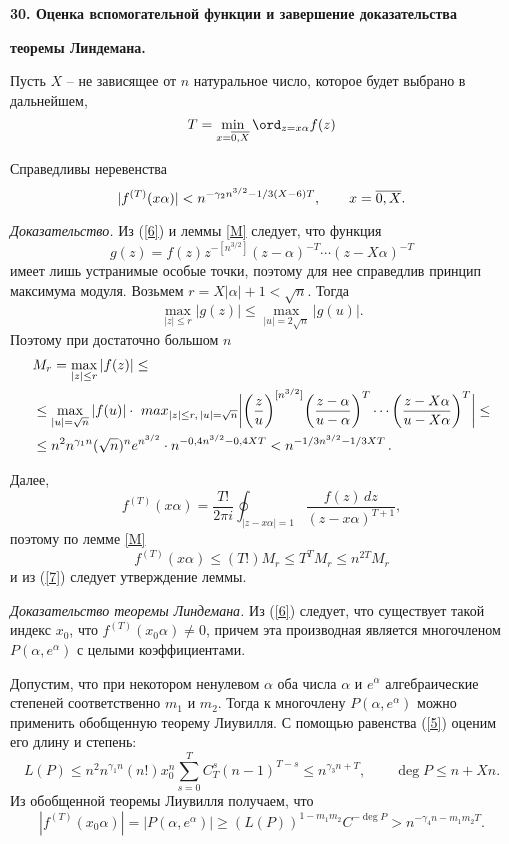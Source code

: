\vskip 5mm \centerline{\bf {30. Оценка
вспомогательной функции и завершение
доказательства}  } \centerline{\bf {теоремы
Линдемана.}}
 \vskip 5mm

Пусть $X$  -- не зависящее от $n$ натуральное число, которое будет
выбрано в дальнейшем,
\begin{equation}\label{6}
T=\min_{x=\ol{0,X}}\ord_{z=x \alpha}f(z)
\end{equation}
\begin{lemma}\label{N}  Справедливы неревенства
$$
|f^{(T)}(x \alpha)| < n^{-\gamma_2n^{3/2}-1/3(X-6)T}, \qquad
x=\overline{0,X}.
$$
\end{lemma}

\emph{Доказательство.}  Из (\ref{6}) и леммы
\ref{M} следует, что функция
$$
g(z)=f(z)z^{-[n^{3/2}]}(z-\alpha)^{-T} \cdots (z-X\alpha)^{-T}
$$
имеет лишь устранимые особые точки, поэтому для нее справедлив
принцип максимума модуля. Возьмем $r=X|\alpha |+1<\sqrt n$. Тогда
$$
\max_{|z| \le r}|g(z)| \le \max_{|u|=2\sqrt n}|g(u)|.
$$
Поэтому   при достаточно большом $n$
\begin{equation}\label{7}
\aligned &
M_r=\max_{|z| \le r}|f(z)| \le  \\
& \le\max_{|u|=\sqrt n}|f(u)| \cdot \ max_{|z|
\le r,\,  |u|=\sqrt n} \biggl|\biggl(\frac zu
\biggr)^{[n^{3/2}]}
\biggl(\frac{z-\alpha}{u-\alpha}\biggr)^T \cdots
\biggl(\frac{z-X\alpha}{u-X\alpha}\biggr)^T
\biggr| \le \\
 & \le n^2n^{\gamma_1n}(\sqrt n)^n
e^{n^{3/2}}\cdot
 n^{-0,4n^{3/2}-0,4XT}<n^{-1/3n^{3/2}-1/3XT}\,.
\endaligned
\end{equation}


Далее,
$$
f^{(T)}(x\alpha)= \frac{T!}{2\pi i}\oint_{|z-x\alpha|=1} \frac
{f(z)\,dz}{(z-x\alpha)^{T+1}},
$$
поэтому по лемме \ref{M}
$$
f^{(T)}(x\alpha) \le (T!)M_r \le T^TM_r \le n^{2T}M_r
$$
и из (\ref{7}) следует утверждение леммы.


\emph{Доказательство теоремы Линдемана.} Из
(\ref{6}) следует, что существует такой индекс
$x_0$, что $f^{(T)}(x_0\alpha) \ne 0$, причем эта
производная является многочленом
$P(\alpha,e^{\alpha})$ с целыми коэффициентами.

Допустим, что при некотором ненулевом $\alpha$
оба числа $\alpha$  и $e^{\alpha}$ алгебраические
степеней соответственно $m_1$ и $m_2$. Тогда к
многочлену $P(\alpha, e^{\alpha}) $ можно
применить обобщенную теорему Лиувилля. С помощью
равенства (\ref{5}) оценим его длину и степень:
$$
L(P) \le n^2n^{\gamma_1n}(n!)x_0^n\sum_{s=0}^TC_T^s(n-1)^{T-s} \le
n^{\gamma_3n+T}, \qquad \deg P \le n+Xn.
$$
Из обобщенной теоремы Лиувилля получаем, что
$$
|f^{(T)}(x_0\alpha)|=|P(\alpha, e^{\alpha})|\ge
(L(P))^{1-m_1m_2}C^{-\deg P} > n^{-\gamma_4n-m_1m_2T}.
$$


